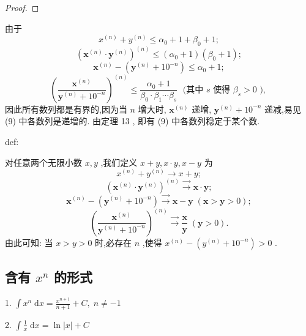 \begin{proof}

\end{proof}
由于
\[
{x}^{\left( n\right) } + {y}^{\left( n\right) } \leq  {\alpha }_{0} + 1 + {\beta }_{0} + 1;
\]
\[
{\left( {\mathbf{x}}^{\left( n\right) } \cdot  {\mathbf{y}}^{\left( n\right) }\right) }^{\left( n\right) } \leq  \left( {{\alpha }_{0} + 1}\right) \left( {{\beta }_{0} + 1}\right) ;
\]
\[
{\mathbf{x}}^{\left( n\right) } - \left( {{\mathbf{y}}^{\left( n\right) } + {10}^{-n}}\right)  \leq  {\alpha }_{0} + 1;
\]
\[
{\left( \frac{{\mathbf{x}}^{\left( n\right) }}{{\mathbf{y}}^{\left( n\right) } + {10}^{-n}}\right) }^{\left( n\right) } \leq  \frac{{\alpha }_{0} + 1}{{\beta }_{0} \cdot  {\beta }_{1}\cdots {\beta }_{s}}\;\text{ (其中 }s\text{ 使得 }{\beta }_{s} > 0\text{ ), }
\]
因此所有数列都是有界的,因为当 \(n\) 增大时, \({\mathbf{x}}^{\left( n\right) }\) 递增, \({\mathbf{y}}^{\left( n\right) } + {10}^{-n}\) 递减,易见 (9) 中各数列是递增的. 由定理 13 , 即有 (9) 中各数列稳定于某个数.

\begin{definition}{}{def:}

\end{definition}
对任意两个无限小数 \(x,y\) ,我们定义 \(x + y,x \cdot  y,x - y\) 为
\[
{x}^{\left( n\right) } + {y}^{\left( n\right) } \rightarrow  x + y;
\]
\[
{\left( {\mathbf{x}}^{\left( n\right) } \cdot  {\mathbf{y}}^{\left( n\right) }\right) }^{\left( n\right) }\overset{ \rightarrow  }{ \rightarrow  }\mathbf{x} \cdot  \mathbf{y};
\]
\[
{\mathbf{x}}^{\left( n\right) } - \left( {{\mathbf{y}}^{\left( n\right) } + {10}^{-n}}\right) \overrightarrow{ \rightarrow  }\mathbf{x} - \mathbf{y}\;\left( {\mathbf{x} > \mathbf{y} > 0}\right) ;
\]
\[
{\left( \frac{{\mathbf{x}}^{\left( n\right) }}{{\mathbf{y}}^{\left( n\right) } + {10}^{-n}}\right) }^{\left( n\right) }\overset{ \rightarrow  }{ \rightarrow  }\frac{\mathbf{x}}{\mathbf{y}}\;\left( {\mathbf{y} > 0}\right) .
\]
由此可知: 当 \(x > y > 0\) 时,必存在 \(n\) ,使得 \({x}^{\left( n\right) } - \left( {{y}^{\left( n\right) } + {10}^{-n}}\right)  > 0\) .

\subsection{含有 \({x}^{n}\) 的形式}

1. \(\int {x}^{n}\mathrm{\;d}x = \frac{{x}^{n + 1}}{n + 1} + C,\;n \neq   - 1\)

2. \(\int \frac{1}{x}\mathrm{\;d}x = \ln \left| x\right|  + C\)

